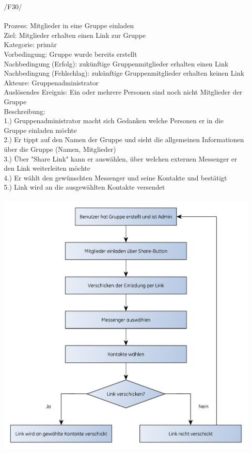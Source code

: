 /F30/ \\ \\
Prozess: Mitglieder in eine Gruppe einladen\\
Ziel: Mitglieder erhalten einen Link zur Gruppe\\
Kategorie: primär\\
Vorbedingung: Gruppe wurde bereits erstellt\\
Nachbedingung (Erfolg): zukünftige Gruppenmitglieder erhalten einen Link\\
Nachbedingung (Fehlschlag): zukünftige Gruppenmitglieder erhalten keinen Link\\
Akteure: Gruppenadministrator\\
Auslösendes Ereignis: Ein oder mehrere Personen sind noch nicht Mitglieder der Gruppe\\
Beschreibung:\\
1.) Gruppenadministrator macht sich Gedanken welche Personen er in die Gruppe einladen möchte\\
2.) Er tippt auf den Namen der Gruppe und sieht die allgemeinen Informationen über die Gruppe (Namen, Mitglieder)\\
3.) Über "Share Link" kann er auswählen, über welchen externen Messenger er den Link weiterleiten möchte\\
4.) Er wählt den gewünschten Messenger und seine Kontakte und bestätigt\\
5.) Link wird an die ausgewählten Kontakte versendet\\ \\

\includegraphics[scale=0.8]{./res/F30_mitglieder_einladen_flowgraph.pdf}
